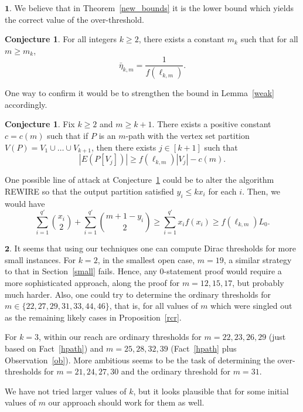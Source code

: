\documentclass[reqno, 12pt]{amsart}
\numberwithin{equation}{section}
\numberwithin{figure}{section}
\theoremstyle{plain}
\theoremstyle{definition}
\newtheorem{conj}[thm]{Conjecture}
\begin{document}
 $\mathbf{1}$. We believe that in Theorem~\ref{new_bounds} it is the lower bound which yields the correct value of the over-threshold.

  \begin{conj}\label{correct}
For all integers $k\ge2$, there exists a constant $m_k$ such that for all $m\ge m_k$,
$$\bar\eta_{k,m}=\frac1{f(\ell_{k,m})}.$$
\end{conj}

 One way to confirm it would be to  strengthen the bound in Lemma~\ref{weak} accordingly.

	
\begin{conj}\label{con:pathedges}
Fix $k\ge 2$ and $m\geq k+1$. There exists a positive constant $c=c(m)$ such that if $P$ is an $m$-path with the vertex set partition $V(P)=V_1\cup\dots\cup V_{k+1}$, then there exists $j\in[k+1]$ such that
\[
|E(P[V_{j}])|\geq f(\ell_{k,m})|V_{j}| - c(m).
\]
\end{conj}

One possible line of attack at Conjecture~\ref{con:pathedges} could be to alter the algorithm REWIRE so that the output partition satisfied $y_i\le kx_i$ for each $i$. Then, we would have
$$\sum_{i=1}^{q'} {x_i \choose 2} + \sum_{i=1}^{q'} {m+1-y_i\choose 2}\ge\sum_{i=1}^{q'}x_if(x_i)\ge f(\ell_{k,m})L_0.$$

\medskip

 $\mathbf{2}$. It seems that using our techniques one can compute Dirac thresholds for more small instances. For $k=2$, in the smallest open case, $m=19$, a similar strategy to that in Section~\ref{small} fails. Hence, any 0-statement proof would require a more sophisticated approach, along the proof for ${m=12, 15, 17}$, but probably much harder. Also, one could try to determine the ordinary thresholds for $m\in\{22,27,29,31,33,44,46\}$, that is, for all values of $m$ which were singled out as the remaining likely cases in Proposition~\ref{rcr}.

 For $k=3$, within our reach are ordinary thresholds for $m=22,23,26,29$ (just based on Fact~\ref{hpath}) and $m=25,28,32,39$ (Fact~\ref{hpath} plus Observation~\ref{ob}). More ambitious seems to be  the task of determining the over-thresholds for $m=21,24, 27,30$  and the ordinary threshold for $m=31$.

 We have not tried larger values of $k$, but it  looks plausible that for some initial values of $m$ our approach should work for them as well.

\medskip
\end{document}
